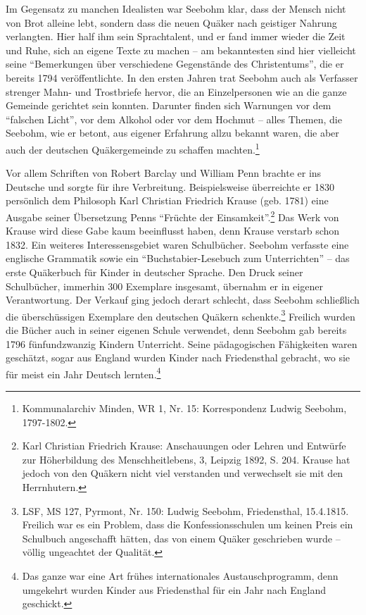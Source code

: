 Im Gegensatz zu manchen Idealisten war Seebohm klar, dass der Mensch nicht von
Brot alleine lebt, sondern dass die neuen Quäker nach geistiger Nahrung
verlangten. Hier half ihm sein Sprachtalent, und er fand immer wieder die Zeit
und Ruhe, sich an eigene Texte zu machen -- am bekanntesten sind hier vielleicht
seine "`Bemerkungen über verschiedene Gegenstände des Christentums"', die er
bereits 1794 veröffentlichte. In den ersten Jahren trat Seebohm auch als
Verfasser strenger Mahn- und Trostbriefe hervor, die an Einzelpersonen wie an
die ganze Gemeinde gerichtet sein konnten. Darunter finden sich Warnungen vor
dem "`falschen Licht"', vor dem Alkohol oder vor dem Hochmut -- alles Themen,
die Seebohm, wie er betont, aus eigener Erfahrung allzu bekannt waren, die aber
auch der deutschen Quäkergemeinde zu schaffen machten.\footnote{Kommunalarchiv
Minden, WR 1, Nr. 15: Korrespondenz Ludwig Seebohm,
1797-1802.}

\medskip

Vor allem Schriften von Robert Barclay und William Penn brachte er ins Deutsche
und sorgte für ihre Verbreitung. Beispielsweise überreichte er 1830 persönlich
dem Philosoph Karl Christian Friedrich Krause (geb. 1781) eine Ausgabe seiner
Übersetzung Penns "`Früchte der Einsamkeit"'.\footnote{Karl Christian Friedrich
Krause: Anschauungen oder Lehren und Entwürfe zur
Höherbildung des Menschheitlebens, 3, Leipzig 1892, S. 204. Krause hat jedoch
von den Quäkern nicht viel verstanden und verwechselt sie mit den Herrnhutern.}
Das Werk von Krause wird diese Gabe kaum beeinflusst haben, denn Krause verstarb
schon 1832. Ein weiteres Interessensgebiet waren Schulbücher. Seebohm verfasste
eine englische Grammatik sowie ein "`Buchstabier-Lesebuch zum Unterrichten"' --
das erste Quäkerbuch für Kinder in deutscher Sprache. Den Druck seiner
Schulbücher, immerhin 300 Exemplare insgesamt, übernahm er in eigener
Verantwortung. Der Verkauf ging jedoch derart schlecht, dass Seebohm schließlich
die überschüssigen Exemplare den deutschen Quäkern schenkte.\footnote{LSF, MS
127, Pyrmont, Nr. 150: Ludwig Seebohm, Friedensthal, 15.4.1815.
Freilich war es ein Problem, dass die Konfessionsschulen um keinen Preis ein
Schulbuch angeschafft hätten, das von einem Quäker geschrieben wurde -- völlig
ungeachtet der Qualität.} Freilich wurden die Bücher auch in seiner
eigenen Schule verwendet, denn Seebohm gab bereits 1796 fünfundzwanzig Kindern
Unterricht. Seine pädagogischen Fähigkeiten waren geschätzt, sogar aus England
wurden Kinder nach Friedensthal gebracht, wo sie für meist ein Jahr Deutsch
lernten.\footnote{Das ganze war eine Art frühes internationales
Austauschprogramm, denn
umgekehrt wurden Kinder aus Friedensthal für ein Jahr nach England geschickt.}

